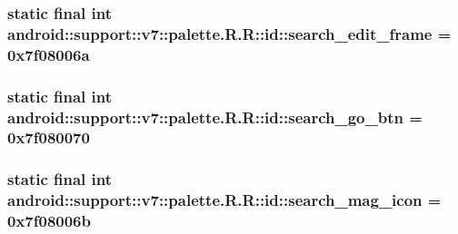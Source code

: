 \hypertarget{classandroid_1_1support_1_1v7_1_1palette_1_1_r_1_1id_3dc9dffc190814e59c8a47c29298f776}{
\subsubsection[{search\_\-edit\_\-frame}]{\setlength{\rightskip}{0pt plus 5cm}static final int android::support::v7::palette.R.R::id::search\_\-edit\_\-frame = 0x7f08006a}}
\label{classandroid_1_1support_1_1v7_1_1palette_1_1_r_1_1id_3dc9dffc190814e59c8a47c29298f776}


\hypertarget{classandroid_1_1support_1_1v7_1_1palette_1_1_r_1_1id_ce3fbb8fef8c575f0b8b7f3a431b4a16}{
\subsubsection[{search\_\-go\_\-btn}]{\setlength{\rightskip}{0pt plus 5cm}static final int android::support::v7::palette.R.R::id::search\_\-go\_\-btn = 0x7f080070}}
\label{classandroid_1_1support_1_1v7_1_1palette_1_1_r_1_1id_ce3fbb8fef8c575f0b8b7f3a431b4a16}


\hypertarget{classandroid_1_1support_1_1v7_1_1palette_1_1_r_1_1id_17f4b458c44220090888058baf076ed2}{
\subsubsection[{search\_\-mag\_\-icon}]{\setlength{\rightskip}{0pt plus 5cm}static final int android::support::v7::palette.R.R::id::search\_\-mag\_\-icon = 0x7f08006b}}
\label{classandroid_1_1support_1_1v7_1_1palette_1_1_r_1_1id_17f4b458c44220090888058baf076ed2}


